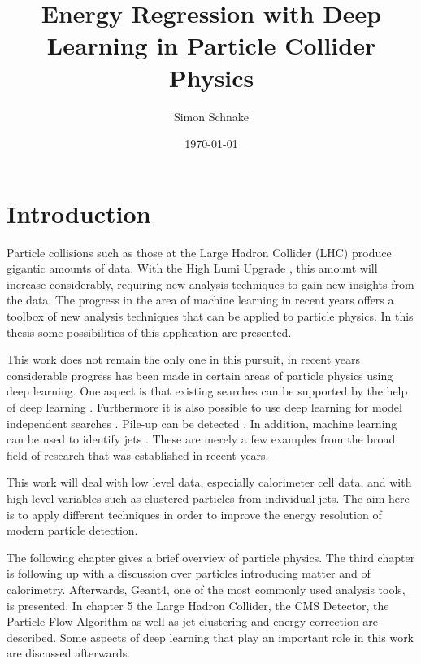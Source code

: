 \documentclass[12pt, a4paper]{thesis}
\author{Simon Schnake}
\date{\today}
\title{Energy Regression with Deep Learning in Particle Collider Physics}
\begin{document}


\tableofcontents
\cleardoublepage

\chapter{Introduction}
\label{sec:org1373fac}

Particle collisions such as those at the Large Hadron Collider (LHC)
\cite{lhc_machine} produce gigantic amounts of data. With the High
Lumi Upgrade \cite{bruening19_high_lumin_large_hadron_collid}, this
amount will increase considerably, requiring new analysis
techniques to gain new insights from the data. The progress in the
area of machine learning in recent years offers a toolbox of new
analysis techniques that can be applied to particle physics. In this
thesis some possibilities of this application are presented.

This work does not remain the only one in this pursuit, in recent
years considerable progress has been made in certain areas of particle
physics using deep learning. One aspect is that existing searches can
be supported by the help of deep learning
\cite{baldi14_searc_exotic_partic_high_energ,baldi15_enhan_higgs_boson_to_with_deep_learn,santos17_machin_learn_techn_searc_decay_chann}.
Furthermore it is also possible to use deep learning for model
independent searches
\cite{dagnolo19_learn_new_physic_from_machin,simone19_guidin_new_physic_searc_with_unsup_learn,heimel19_qcd_or_what}.
Pile-up can be detected
\cite{komiske17_pileup_mitig_with_machin_learn_pumml}.  In addition,
machine learning can be used to identify jets
\cite{komiske19_energ_flow_networ,cogan15_jet_images,oliveira16_jet_images_deep_learn_edition,baldi16_jet_subst_class_high_energ,barnard17_parton_shower_uncer_jet_subst,kasieczka17_deep_learn_top_tagger_or_end_qcd,datta17_how_much_infor_is_jet,komiske17_deep_learn_color}.
These are merely a few examples from the broad field of research that
was established in recent years.

This work will deal with low level data, especially calorimeter cell
data, and with high level variables such as clustered particles from
individual jets.  The aim here is to apply different techniques in
order to improve the energy resolution of modern particle detection.

The following chapter gives a brief overview of particle physics. The
third chapter is following up with a discussion over particles
introducing matter and of calorimetry. Afterwards, Geant4, one of the
most commonly used analysis tools, is presented. In chapter 5 the
Large Hadron Collider, the CMS Detector, the Particle Flow Algorithm
as well as jet clustering and energy correction are described. Some
aspects of deep learning that play an important role in this work are
discussed afterwards.
\end{document}
